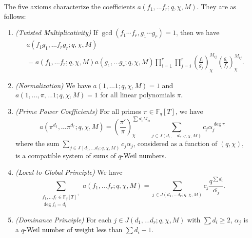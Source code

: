 \documentclass[11pt,letterpaper]{article}
\theoremstyle{definition}
\theoremstyle{remark}
\numberwithin{equation}{section}
\theoremstyle{dotless}
\newcommand{\F}{\mathbb{F}}
\newcommand{\res}[2]{\left(\frac{#1}{#2}\right)}
\begin{document}
The five axioms characterize the coefficients $a(f_1, \ldots f_r; q, \chi, M)$. They are as follows:

\begin{enumerate}
\item \label{Axiom1} \emph{(Twisted Multiplicativity)} If $\gcd(f_1\cdots f_r, g_1\cdots g_r)=1$, then we have 
\begin{equation}
\begin{split}
    &a(f_1g_1, \ldots f_rg_r; q, \chi, M) \\
    &= a(f_1, \ldots f_r; q, \chi, M)a(g_1, \ldots g_r; q, \chi, M) \prod_{i=1}^r \prod_{j=i}^r \res{f_i}{g_j}_\chi^{M_{ij}} \res{g_i}{f_j}_\chi^{M_{ij}}.
    \end{split}
\end{equation}
\item \label{Axiom2} \emph{(Normalization)} We have $a(1, \ldots 1; q, \chi, M) = 1 $ and $a(1, \ldots, \pi, \ldots 1; q, \chi, M)=1$ for all linear polynomials $\pi$. 
\item \label{Axiom3} \emph{(Prime Power Coefficients)} For all primes $\pi \in \F_q[T]$, we have 
\begin{equation}
a(\pi^{d_1}, \ldots \pi^{d_r}; q, \chi, M) = \res{\pi'}{\pi}_\chi^{\sum d_i M_{ii}} \sum_{j \in J(d_1, \ldots d_r; q, \chi, M)} c_j \alpha_j^{\deg \pi} 
\end{equation}
where the sum $\sum\limits_{j \in J(d_1, \ldots d_r; q, \chi, M)} c_j \alpha_j$, considered as a function of $(q, \chi)$, is a compatible system of sums of $q$-Weil numbers.

\item \label{Axiom4} \emph{(Local-to-Global Principle)} We have 
\begin{equation}
 \sum_{\substack{f_1, \ldots f_r \in \F_q[T]^+ \\ \deg f_i = d_i}} a(f_1, \ldots f_r; q, \chi, M) = \sum_{j \in J(d_1, \ldots d_r; q, \chi, M)} c_j \frac{q^{\sum d_i}}{\overline{\alpha_j}}.
\end{equation}

\item \label{Axiom5} \emph{(Dominance Principle)} For each $j \in J(d_1, \ldots d_r; q, \chi, M)$ with $\sum d_i \geq 2$, $\alpha_j$ is a $q$-Weil number of weight less than $\sum d_i - 1$. 
\end{enumerate}
\end{document}
